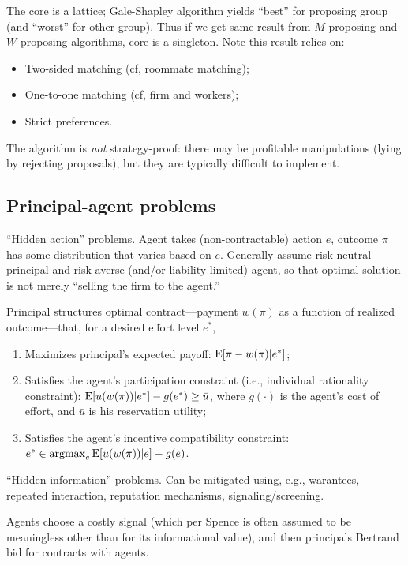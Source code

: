 \documentclass[8pt,letterpaper, landscape]{extarticle} %
\begin{document}
\begin{multicols}{3}
\begin{description}
The core is a lattice; Gale-Shapley algorithm yields ``best'' for proposing group (and ``worst'' for other group). Thus if we get same result from $ M $-proposing and $ W $-proposing algorithms, core is a singleton. Note this result relies on:
\begin{itemize}
\item Two-sided matching (cf, roommate matching);
\item One-to-one matching (cf, firm and workers);
\item Strict preferences.
\end{itemize}

The algorithm is \textit{not} strategy-proof: there may be profitable manipulations (lying by rejecting proposals), but they are typically difficult to implement.

\subsection{Principal-agent problems}
 ``Hidden action'' problems. Agent takes (non-contractable) action $ e $, outcome $ \pi $ has some distribution that varies based on $ e $. Generally assume risk-neutral principal and risk-averse (and/or liability-limited) agent, so that optimal solution is not merely ``selling the firm to the agent.''

Principal structures optimal contract---payment $ w(\pi) $ as a function of realized outcome---that, for a desired effort level $ e^* $,
\begin{enumerate}
\item Maximizes principal's expected payoff: $ \operatorname{E} [\pi - w(\pi) | e^*] $;
\item Satisfies the agent's participation constraint (i.e., individual rationality constraint): $ \operatorname{E} [u(w(\pi)) | e^* ] - g(e^*) \geq \bar{u} $, where $ g(\cdot) $ is the agent's cost of effort, and $ \bar{u} $ is his reservation utility;
\item Satisfies the agent's incentive compatibility constraint: $ e^* \in \operatorname*{argmax}_{e} \operatorname{E} [u(w(\pi)) | e ] - g(e) $.
\end{enumerate}

  ``Hidden information'' problems. Can be mitigated using, e.g., warantees, repeated interaction, reputation mechanisms, signaling/screening.

 Agents choose a costly signal (which per Spence is often assumed to be meaningless other than for its informational value), and then principals Bertrand bid for contracts with agents.


\end{description}
\end{multicols}
\end{document}
